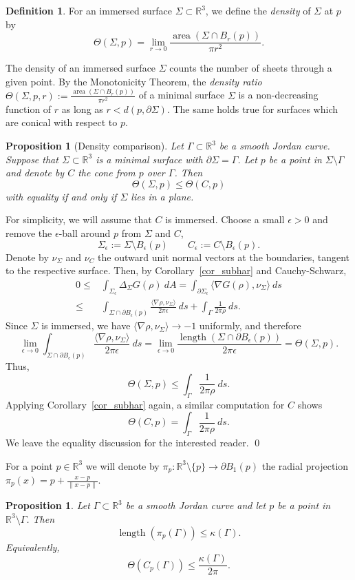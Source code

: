 \documentclass[a4paper,12pt]{amsart}
\numberwithin{equation}{section}
\def\a{\operatorname{area}}
\def\length{\operatorname{length}}
\def\D{\partial}
\def\R{\mathbb R}
\def\ka{\kappa}
\def\eps{\epsilon}
\def\Ga{\Gamma}
\def\Si{\Sigma}
\def\<{\langle}
\def\>{\rangle}
\theoremstyle{plain}
\newtheorem{prop}[thm]{Proposition}
\theoremstyle{named}
\theoremstyle{definition}
\newtheorem{dfn}[thm]{Definition}
\theoremstyle{remark}
\newcommand{\bdfn}{\begin{dfn}}
\newcommand{\edfn}{\end{dfn}}
\newcommand{\bprop}{\begin{prop}}
\newcommand{\eprop}{\end{prop}}
\begin{document}
\bdfn
For an immersed surface $\Si\subset\R^3$, we define the {\em density} of $\Si$ at $p$ by
\[\Theta(\Si,p)=\lim\limits_{r\to 0}\frac{\a(\Si\cap B_r(p))}{\pi r^2}.\]
\edfn

The density of an immersed surface $\Si$ counts the number of sheets through a given point.
By the Monotonicity Theorem, the {\em density ratio} $\Theta(\Si,p,r):=\frac{\a(\Si\cap B_r(p))}{\pi r^2}$ of a minimal surface $\Si$
is a non-decreasing function of $r$ as long as $r<d(p,\D\Si)$. The same holds true for surfaces which are conical with respect to $p$.

\bprop[Density comparison]\label{prop_dens_comp}
Let $\Ga\subset\R^3$ be a smooth Jordan curve. Suppose that $\Si\subset\R^3$
is a minimal surface with $\D\Si=\Ga$. Let $p$ be a point in $\Si\setminus\Ga$ and denote by $C$ the
cone from $p$ over $\Ga$. Then
\[\Theta(\Si,p)\leq \Theta(C,p)\]
with equality if and only if $\Si$ lies in a plane. 
\eprop

\proof
For simplicity, we will assume that $C$ is immersed.
Choose a small $\eps>0$ and remove the $\eps$-ball around $p$ from $\Si$ and $C$,
\[\Si_\eps:=\Si\setminus B_\eps(p) \quad\quad C_\eps:=C\setminus B_\eps(p).\]
Denote by $\nu_\Si$ and $\nu_C$ the outward unit normal vectors at the boundaries, tangent to the respective surface.
Then, by Corollary~\ref{cor_subhar} and Cauchy-Schwarz,
\begin{align*}
0\leq&\int_{\Si_\eps}\Delta_\Si G(\rho)\ dA=\int_{\D\Si_\eps}\<\nabla G(\rho),\nu_\Si\>\ ds\\
\leq&\int_{\Si\cap\D B_\eps(p)}\frac{\<\nabla\rho,\nu_\Si\>}{2\pi\eps}\ ds +\int_{\Ga}\frac{1}{2\pi\rho}\ ds.
\end{align*} 
Since $\Si$ is immersed, we have $\<\nabla\rho,\nu_\Si\>\to-1$ uniformly, and therefore
\[\lim\limits_{\eps\to 0}\int_{\Si\cap\D B_\eps(p)}\frac{\<\nabla\rho,\nu_\Si\>}{2\pi\eps}\ ds=
\lim\limits_{\eps\to 0}\frac{\length(\Si\cap\D B_\eps(p))}{2\pi\eps}=\Theta(\Si,p).
\]
Thus,
\[\Theta(\Si,p)\leq \int_{\Ga}\frac{1}{2\pi\rho}\ ds.\]
Applying Corollary~\ref{cor_subhar} again, a similar computation for $C$ shows
\[\Theta(C,p)= \int_{\Ga}\frac{1}{2\pi\rho}\ ds.\]
We leave the equality discussion for the interested reader.
\qed
\medskip

For a point $p\in\R^3$ we will denote by $\pi_p:\R^3\setminus\{p\}\to\D B_1(p)$
the radial projection $\pi_p(x)=p+\frac{x-p}{\|x-p\|}$.

\bprop\label{prop_dens_est}
Let $\Ga\subset\R^3$ be a smooth Jordan curve and let $p$
be a point in $\R^3\setminus\Ga$. Then
\[\length(\pi_p(\Ga))\leq\ka(\Ga).\]
Equivalently,
\[\Theta(C_p(\Ga))\leq\frac{\ka(\Ga)}{2\pi}.\]
\eprop
\end{document}
